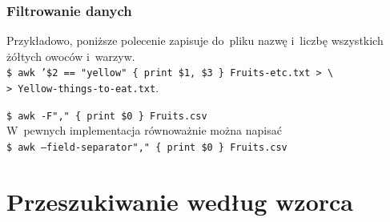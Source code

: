 \documentclass[10pt,t]{beamer}
\begin{document}
\begin{frame}
  \frametitle{Filtrowanie danych}


  Przykładowo, poniższe polecenie zapisuje do~pliku nazwę i~liczbę
  wszystkich żółtych owoców i~warzyw. \\
  \texttt{\$ awk '\$2 == "yellow" \{ print \$1, \$3 \} Fruits-etc.txt
    > \textbackslash} \\
  \texttt{> Yellow-things-to-eat.txt}.

  \texttt{\$ awk -F"," \{ print \$0 \} Fruits.csv} \\
  W~pewnych implementacja równoważnie można napisać \\
  \texttt{\$ awk --field-separator"," \{ print \$0 \} Fruits.csv}

\end{frame}










\section{Przeszukiwanie według wzorca}
\end{document}
